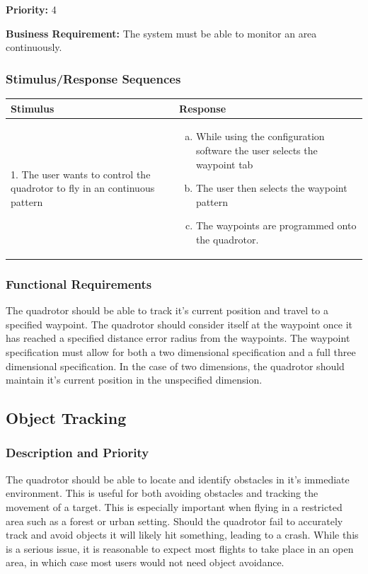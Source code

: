 \documentclass[english]{article}
\numberwithin{equation}{section} %
\begin{document}
\textbf{Priority:} 4

\textbf{Business Requirement:} The system must be able to monitor an area continuously.

\subsubsection{Stimulus/Response Sequences}

\begin{tabular}{p{3cm} | p{8.5cm}}
\hline
\textbf{Stimulus} & \textbf{Response}\\
\hline
1. The user wants to control the quadrotor to fly in an continuous pattern &
\begin{enumerate}[(a)]\itemsep1pt %
\item While using the configuration software the user selects the waypoint tab
\item The user then selects the waypoint pattern
\item The waypoints are programmed onto the quadrotor.
\end{enumerate}
\\ 
\hline
\end{tabular}
\subsubsection{Functional Requirements}
The quadrotor should be able to track it's current position and travel to a specified waypoint. The quadrotor should consider itself at the waypoint once it has reached a specified distance error radius from the waypoints. The waypoint specification must allow for both a two dimensional specification and a full three dimensional specification. In the case of two dimensions, the quadrotor should maintain it's current position in the unspecified dimension.

\bigskip
\subsection{Object Tracking}
\subsubsection{Description and Priority}
The quadrotor should be able to locate and identify obstacles in it's immediate environment. This is useful for both avoiding obstacles and tracking the movement of a target. This is especially important when flying in a restricted area such as a forest or urban setting. Should the quadrotor fail to accurately track and avoid objects it will likely hit something, leading to a crash. While this is a serious issue, it is reasonable to expect most flights to take place in an open area, in which case most users would not need object avoidance.
\end{document}
